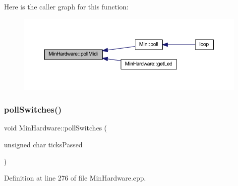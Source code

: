 Here is the caller graph for this function\+:
\nopagebreak
\begin{figure}[H]
\begin{center}
\leavevmode
\includegraphics[width=350pt]{class_min_hardware_a4978945a745e4c2690e05789eff52976_icgraph}
\end{center}
\end{figure}
\mbox{\label{class_min_hardware_a135650ade19c661a9e20f0a410722a10}} 
\subsubsection{\texorpdfstring{poll\+Switches()}{pollSwitches()}}
{\footnotesize\ttfamily void Min\+Hardware\+::poll\+Switches (\begin{DoxyParamCaption}\item[{unsigned char}]{ticks\+Passed }\end{DoxyParamCaption})}



Definition at line 276 of file Min\+Hardware.\+cpp.

